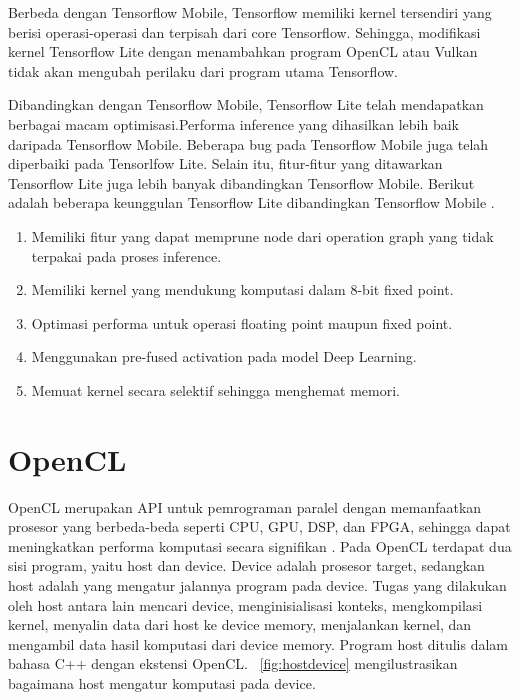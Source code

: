 Berbeda dengan Tensorflow Mobile, Tensorflow memiliki kernel tersendiri yang berisi operasi-operasi \deeplearning \inference dan terpisah dari core Tensorflow. Sehingga, modifikasi kernel Tensorflow Lite dengan menambahkan program OpenCL atau Vulkan  tidak akan mengubah perilaku dari program utama Tensorflow.

Dibandingkan dengan Tensorflow Mobile, Tensorflow Lite telah mendapatkan berbagai macam optimisasi.Performa inference yang dihasilkan lebih baik daripada Tensorflow Mobile. Beberapa bug pada Tensorflow Mobile juga telah diperbaiki pada Tensorlfow Lite. Selain itu, fitur-fitur yang ditawarkan Tensorflow Lite juga lebih banyak dibandingkan Tensorflow Mobile. Berikut adalah beberapa keunggulan Tensorflow Lite dibandingkan Tensorflow Mobile \cite{tflite}.

\begin{enumerate}
	\item Memiliki fitur yang dapat memprune node dari operation graph yang tidak terpakai pada proses inference.
	\item Memiliki kernel yang mendukung komputasi dalam 8-bit fixed point.
	\item Optimasi performa untuk operasi floating point maupun fixed point.
	\item Menggunakan pre-fused activation pada model Deep Learning.
	\item Memuat kernel secara selektif sehingga menghemat memori.
\end{enumerate}

\section{OpenCL}
OpenCL merupakan API untuk pemrograman paralel dengan memanfaatkan prosesor yang berbeda-beda seperti CPU, GPU, DSP, dan FPGA, sehingga dapat meningkatkan performa komputasi secara signifikan \cite{opencl}. Pada OpenCL terdapat dua sisi program, yaitu host dan device. Device adalah prosesor target, sedangkan host adalah yang mengatur jalannya program pada device. Tugas yang dilakukan oleh host antara lain mencari device, menginisialisasi konteks, mengkompilasi kernel, menyalin data dari host ke device memory, menjalankan kernel, dan mengambil data hasil komputasi dari device memory. Program host ditulis dalam bahasa C++ dengan ekstensi OpenCL. \pic~\ref{fig:hostdevice} mengilustrasikan bagaimana host mengatur komputasi pada device.

